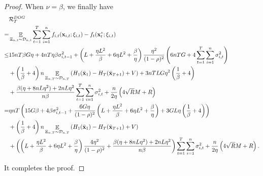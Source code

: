 \documentclass{article}
\begin{document}
\begin{proof}
When $\nu = \beta$, we finally have 
\begin{align}
\nonumber
& {\mathcal{R}}_T^{DOG} \\ \nonumber 
= & \mathop{\mathbb{E}}_{ \Xi_{n,t} \sim \mathcal{D}_{n,t} } \sum_{t=1}^T\sum_{i=1}^n f_{i,t}({\bf x}_{i,t};\xi_{i,t}) - f_t({\bf x}_t^\ast;\xi_{i,t}) \\ \nonumber
\le & 15 nT\beta G \eta + 4nT\eta \beta\sigma_{i,t-1}^2 + \left(  L + \frac{\eta L^2}{\beta}  + 6\eta L^2  + \frac{\beta}{\eta}  \right) \frac{\eta^2}{(1-\rho)^2}   \left(  6nTG + 4\sum_{t=1}^T\sum_{i=1}^n \sigma_{i,t}^2  \right) \\ \nonumber 
&+ \left( \frac{1}{\beta} + 4 \right)n\mathop{\mathbb{E}}_{ \Xi_{n,T} \sim \mathcal{D}_{n,T} }\left( H_1(\bar{{\bf x}}_1) - H_T(\bar{{\bf x}}_{T+1}) + V \right)  + 3nTLG\eta^2\left(  \frac{1}{\beta} + 4  \right) \\ \nonumber 
& + \frac{\beta(\eta + 8nL\eta^2) + 2nL\eta^2}{n\beta} \sum_{t=1}^T\sum_{i=1}^n\sigma_{i,t}^2  + \frac{n}{2\eta}\left(  4\sqrt{R}M + R   \right) \\ \nonumber
= &  \eta nT\left(  15G\beta + 4\beta\sigma_{i,t-1}^2 + \frac{6G\eta}{(1-\rho)^2}\left(  L + \frac{\eta L^2}{\beta} + 6\eta L^2 + \frac{\beta}{\eta}  \right) + 3GL\eta\left( \frac{1}{\beta} + 4 \right)   \right) \\ \nonumber 
& + \left( \frac{1}{\beta}+4 \right)n \mathop{\mathbb{E}}_{ \Xi_{n,T} \sim \mathcal{D}_{n,T} }\left( H_1(\bar{{\bf x}}_1) - H_T(\bar{{\bf x}}_{T+1}) + V \right) \\ \nonumber
& + \left(  \left(  L + \frac{\eta L^2}{\beta}  + 6\eta L^2  + \frac{\beta}{\eta}  \right) \frac{4\eta^2}{(1-\rho)^2} + \frac{\beta(\eta + 8nL\eta^2) + 2nL\eta^2}{n\beta}  \right) \sum_{t=1}^T\sum_{i=1}^n \sigma_{i,t}^2 + \frac{n}{2\eta}\left(  4\sqrt{R}M + R   \right).
\end{align} 

It completes the proof.



\end{proof}
\end{document}
